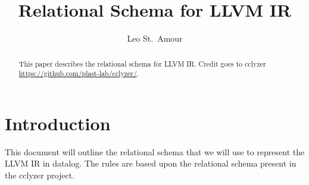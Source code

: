 \documentclass[letterpaper, 10 pt, conference]{article}
\title{\LARGE \bf
    Relational Schema for LLVM IR
}
\author{Leo St.\ Amour\\%
}
\begin{document}
\maketitle
\thispagestyle{empty}
\pagestyle{empty}

\begin{abstract}
    This paper describes the relational schema for LLVM IR.
    Credit goes to cclyzer \url{https://github.com/plast-lab/cclyzer/}.
\end{abstract}

\section{Introduction}
This document will outline the relational schema that we will use to represent the LLVM IR in datalog.
The rules are based upon the relational schema present in the cclyzer project.





\addtolength{\textheight}{-12cm}   
%
\end{document}
